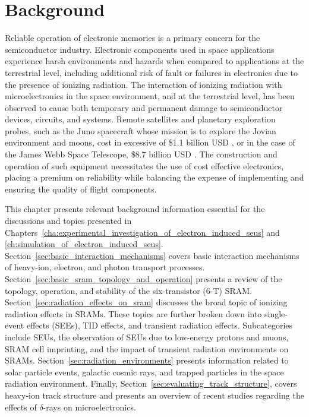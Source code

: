 \chapter{Background} %
\label{chap:background}
Reliable operation of electronic memories is a primary concern for the semiconductor industry. 
Electronic components used in space applications experience harsh environments and hazards when compared to applications at the terrestrial level, including additional risk of fault or failures in electronics due to the presence of ionizing radiation.
The interaction of ionizing radiation with microelectronics in the space environment, and at the terrestrial level, has been observed to cause both temporary and permanent damage to semiconductor devices, circuits, and systems.
Remote satellites and planetary exploration probes, such as the Juno spacecraft whose mission is to explore the Jovian environment and moons, cost in excessive of \$1.1 billion USD \cite{junopresskit}, or in the case of the James Webb Space Telescope, \$8.7 billion USD \cite{jwstfaq}.
The construction and operation of such equipment necessitates the use of cost effective electronics, placing a premium on reliability while balancing the expense of implementing and ensuring the quality of flight components.

This chapter presents relevant background information essential for the discussions and topics presented in Chapters~\ref{cha:experimental_investigation_of_electron_induced_seus} and \ref{ch:simulation_of_electron_induced_seus}.
Section~\ref{sec:basic_interaction_mechanisms} covers basic interaction mechanisms of heavy-ion, electron, and photon transport processes.
Section~\ref{sec:basic_sram_topology_and_operation} presents a review of the topology, operation, and stability of the six-transistor (6-T) SRAM.
Section~\ref{sec:radiation_effects_on_sram} discusses the broad topic of ionizing radiation effects in SRAMs.
These topics are further broken down into single-event effects (SEEs), TID effects, and transient radiation effects.
Subcategories include SEUs, the observation of SEUs due to low-energy protons and muons, SRAM cell imprinting, and the impact of transient radiation environments on SRAMs. 
Section~\ref{sec:radiation_environments} presents information related to solar particle events, galactic cosmic rays, and trapped particles in the space radiation environment.
Finally, Section~\ref{sec:evaluating_track_structure}, covers heavy-ion track structure and presents an overview of recent studies regarding the effects of $\delta$-rays on microelectronics.

